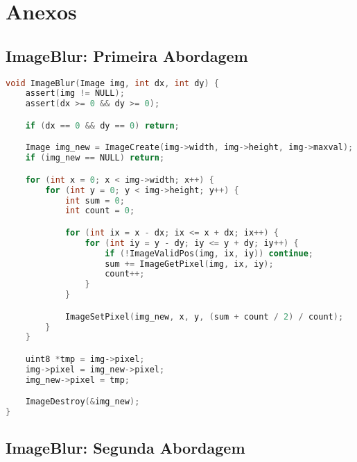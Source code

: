 \chapter{Anexos}
\label{ch:anexos}

\scriptsize

\section{ImageBlur: Primeira Abordagem}
\label{sec:anexos/blur1}

\begin{lstlisting}[language=C]
void ImageBlur(Image img, int dx, int dy) {
    assert(img != NULL);
    assert(dx >= 0 && dy >= 0);

    if (dx == 0 && dy == 0) return;

    Image img_new = ImageCreate(img->width, img->height, img->maxval);
    if (img_new == NULL) return;

    for (int x = 0; x < img->width; x++) {
        for (int y = 0; y < img->height; y++) {
            int sum = 0;
            int count = 0;

            for (int ix = x - dx; ix <= x + dx; ix++) {
                for (int iy = y - dy; iy <= y + dy; iy++) {
                    if (!ImageValidPos(img, ix, iy)) continue;
                    sum += ImageGetPixel(img, ix, iy);
                    count++;
                }
            }

            ImageSetPixel(img_new, x, y, (sum + count / 2) / count);
        }
    }

    uint8 *tmp = img->pixel;
    img->pixel = img_new->pixel;
    img_new->pixel = tmp;

    ImageDestroy(&img_new);
}
\end{lstlisting}

\pagebreak

\section{ImageBlur: Segunda Abordagem}
\label{sec:anexos/blur2}

